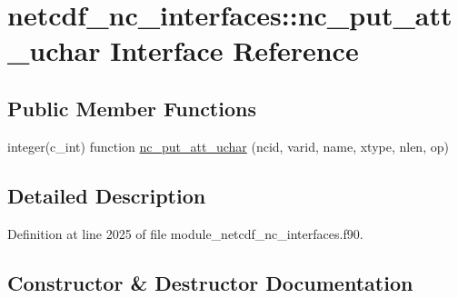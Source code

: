 \hypertarget{interfacenetcdf__nc__interfaces_1_1nc__put__att__uchar}{}\section{netcdf\+\_\+nc\+\_\+interfaces\+:\+:nc\+\_\+put\+\_\+att\+\_\+uchar Interface Reference}
\label{interfacenetcdf__nc__interfaces_1_1nc__put__att__uchar}
\subsection*{Public Member Functions}
\begin{DoxyCompactItemize}
\item 
integer(c\+\_\+int) function \hyperlink{interfacenetcdf__nc__interfaces_1_1nc__put__att__uchar_a9ba8b4f5c81b9d6ee2ea6d9052dec761}{nc\+\_\+put\+\_\+att\+\_\+uchar} (ncid, varid, name, xtype, nlen, op)
\end{DoxyCompactItemize}


\subsection{Detailed Description}


Definition at line 2025 of file module\+\_\+netcdf\+\_\+nc\+\_\+interfaces.\+f90.



\subsection{Constructor \& Destructor Documentation}
\mbox{\label{interfacenetcdf__nc__interfaces_1_1nc__put__att__uchar_a9ba8b4f5c81b9d6ee2ea6d9052dec761}} 
